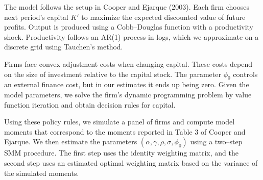 \documentclass[12pt]{article}
\begin{document}
The model follows the setup in Cooper and Ejarque (2003). Each firm chooses next
period's capital $K'$ to maximize the expected discounted value of future profits.
Output is produced using a Cobb--Douglas function with a productivity shock.
Productivity follows an AR(1) process in logs, which we approximate on a 
discrete grid using Tauchen's method.

Firms face convex adjustment costs when changing capital. These costs depend on
the size of investment relative to the capital stock. The parameter $\phi_0$
controls an external finance cost, but in our estimates it ends up being zero.
Given the model parameters, we solve the firm's dynamic programming problem by
value function iteration and obtain decision rules for capital.

Using these policy rules, we simulate a panel of firms and compute model moments
that correspond to the moments reported in Table 3 of Cooper and Ejarque.
We then estimate the parameters $(\alpha, \gamma, \rho, \sigma, \phi_0)$ using a 
two--step SMM procedure. The first step uses the identity weighting matrix, and 
the second step uses an estimated optimal weighting matrix based on the 
variance of the simulated moments.
\end{document}
